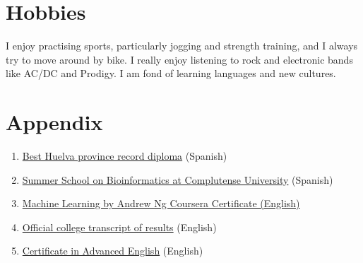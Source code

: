 \documentclass[paper=a4,fontsize=11pt]{article} %
\newcommand{\NewPart}[1]{\section*{
									{#1}}}
\begin{document}
\NewPart{Hobbies}
I enjoy practising sports, particularly jogging and strength training, and I always try to move around by bike. I really enjoy listening to rock and electronic bands like AC/DC and Prodigy. I am fond of learning languages and new cultures.





\NewPart{Appendix}
\begin{enumerate}


\item \hyperlink{premio_extraordinario}{Best Huelva province record diploma} (Spanish)
\item \hyperlink{complu}{Summer School on Bioinformatics at Complutense University} (Spanish)

\item \hyperlink{ML-Coursera}{Machine Learning by Andrew Ng Coursera Certificate (English)}

\item \hyperlink{exp-en}{Official college transcript of results} (English)
\item \hyperlink{cae}{Certificate in Advanced English} (English)
\end{enumerate}
%



\end{document}
